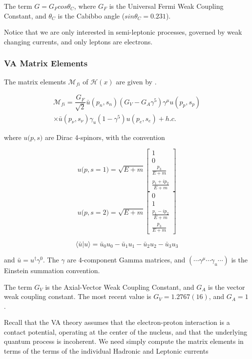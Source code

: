 \documentclass[%
 aip,
 jmp,%
 amsmath,amssymb,
 reprint,%
]{revtex4-1}
\begin{document}
The term $G=G_{F}cos\theta_{C}$, where  $G_{F}$ is the Universal Fermi Weak Coupling Constant, and $\theta_{C}$ is the Cabibbo angle ($sin\theta_{C}=0.231$).

Notice that we are only interested in semi-leptonic processes, governed by weak changing currents, and only leptons are electrons.  


\subsubsection{VA Matrix Elements}

The matrix elements $\mathcal{M}_{fi}$ of $\mathcal{H}(x)$ are given by \cite{zuber}.  
 
\begin{multline}
\mathcal{M}_{fi}=\dfrac{G_{F}}{\sqrt{2}}\bar{u}(p_{n},s_{n})(G_{V}-G_{A}\gamma^{5})\gamma^{\mu}u(p_{p},s_{p})\\
\times\bar{u}(p_{\nu},s_{\nu})\gamma_{u}(1-\gamma^{5})u(p_{e},s_{e}) + h.c.
\end{multline}

where $u{(p},s)$ are Dirac 4-spinors, with the convention 

$$u{(p},s=1)=\sqrt{E+m}\left[\begin{array}{c}
1\\
0\\
\frac{p_{3}}{E+m}\\
\frac{p_{1}+ip_{2}}{E+m}
\end{array}\right]$$
$$u{(p},s=2)=\sqrt{E+m}\left[\begin{array}{c}
0\\
1\\
\frac{p_{1}-ip_{2}}{E+m}\\
\frac{p_{3}}{E+m}
\end{array}\right]$$

$$\langle\bar{u}|u\rangle=\bar{u}_{0}u_{0}-\bar{u}_{1}u_{1}-\bar{u}_{2}u_{2}-\bar{u}_{3}u_{3}$$

and $\bar{u}=u^{\dagger}\gamma^{0}$.  The $\gamma$ are 4-component Gamma matrices, and  $(\cdots\gamma^{\mu}\cdots\gamma_{u}\cdots)$ is the Einstein summation convention. 

The term $G_{V}$ is the Axial-Vector Weak Coupling Constant, and $G_{A}$ is the vector weak coupling
constant.  The most recent value is $G_{V}=1.2767(16)$, and $G_{A}=1$ \cite{vacoupling}.

Recall that the VA theory assumes that the electron-proton interaction is a contact potential, operating at the center of the nucleus, and that the underlying quantum process is incoherent.    We need simply compute the matrix elements in terms of the terms of the individual Hadronic and Leptonic currents
\end{document}
